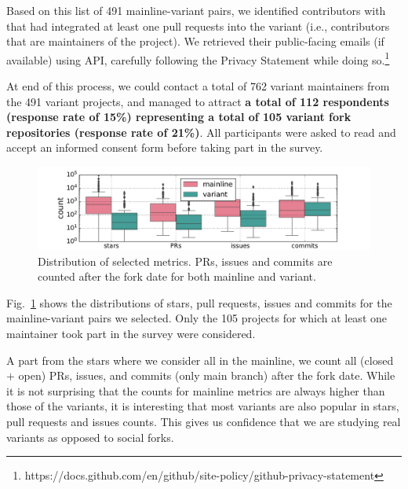 Based on this list of 491 mainline-variant pairs, we identified contributors with that had integrated at least one pull requests into the variant (i.e., contributors that are maintainers of the project).
We retrieved their public-facing emails (if available) using \gh API, carefully following the \gh Privacy Statement while doing so.\footnote{https://docs.github.com/en/github/site-policy/github-privacy-statement}

At end of this process, we could contact a total of 762 variant maintainers from the 491 variant projects, and managed to attract \textbf{a total of 112 respondents (response rate of 15\%) representing a total of 105 variant fork repositories (response rate of 21\%)}.
All participants were asked to read and accept an informed consent form before taking part in the survey.


\begin{figure}[ht]
\begin{center}
    \centering
    \includegraphics[width=\columnwidth]{pdfs/stats.pdf}
    \caption{Distribution of selected metrics. PRs, issues and commits are counted after the fork date for both mainline and variant.}
    \label{fig:stats}
\end{center}
\vspace{-.3cm}
\end{figure}

Fig.~\ref{fig:stats} shows the distributions of stars, pull requests, issues and commits for the mainline-variant pairs we selected. Only the 105 projects for which at least one maintainer took part in the survey were considered.

A part from the stars where we consider all in the mainline, we count all (closed + open) PRs, issues, and commits (only main branch) after the fork date. While it is not surprising that the counts for mainline metrics are always higher than those of the variants, it is interesting that most variants are also popular in stars, pull requests and issues counts. This gives us confidence that we are studying real variants as opposed to social forks.


